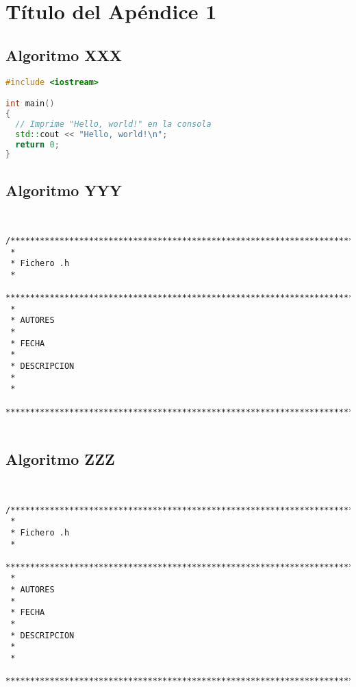 \chapter{Título del Apéndice 1}
\label{appendix:1}

\section{Algoritmo XXX}
\label{sec:XXX}

\begin{lstlisting}[language=C++]
#include <iostream>

int main()
{
  // Imprime "Hello, world!" en la consola
  std::cout << "Hello, world!\n";
  return 0;
}
\end{lstlisting}

\section{Algoritmo YYY}
\label{sec:YYY}

\begin{center}
\begin{footnotesize}
\begin{verbatim}


/***********************************************************************************
 *
 * Fichero .h
 *
 ***********************************************************************************
 *
 * AUTORES
 *
 * FECHA
 *
 * DESCRIPCION
 *
 *
 ************************************************************************************/
 
\end{verbatim}
\end{footnotesize}
\end{center}

\section{Algoritmo ZZZ}
\label{Apendice1:ZZZ}

\begin{center}
\begin{footnotesize}
\begin{verbatim}


/***********************************************************************************
 *
 * Fichero .h
 *
 ***********************************************************************************
 *
 * AUTORES
 *
 * FECHA
 *
 * DESCRIPCION
 *
 *
 ************************************************************************************/
 
\end{verbatim}
\end{footnotesize}
\end{center}

